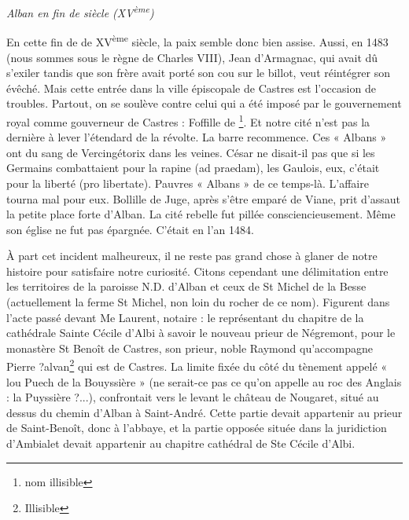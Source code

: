 \begin{center}
    {\Large\itshape Alban en fin de siècle (XV\textsuperscript{ème})}
\end{center}

\bigskip

En cette fin de de XV\textsuperscript{ème} siècle, la paix semble donc bien assise. Aussi, en 1483 (nous sommes sous le règne de Charles VIII), Jean d'Armagnac, qui avait dû s'exiler tandis que son frère avait porté son cou sur le billot, veut réintégrer son évêché. Mais cette entrée dans la ville épiscopale de Castres est l'occasion de troubles. Partout, on se soulève contre celui qui a été imposé par le gouvernement royal comme gouverneur de Castres : Foffille de \footnote{nom illisible}. Et notre cité n'est pas la dernière à lever l'étendard de la révolte. La barre recommence. Ces « Albans » ont du sang de Vercingétorix dans les veines. César ne disait-il pas que si les Germains combattaient pour la rapine (ad praedam), les Gaulois, eux, c'était pour la liberté (pro libertate). Pauvres « Albans » de ce temps-là. L'affaire tourna mal pour eux. Bollille de Juge, après s'être emparé de Viane, prit d'assaut la petite place forte d'Alban. La cité rebelle fut pillée consciencieusement. Même son église ne fut pas épargnée. C'était en l'an 1484.

À part cet incident malheureux, il ne reste pas grand chose à glaner de notre histoire pour satisfaire notre curiosité. Citons cependant une délimitation entre les territoires de la paroisse N.D. d'Alban et ceux de St Michel de la Besse (actuellement la ferme St Michel, non loin du rocher de ce nom). Figurent dans l'acte passé devant Me Laurent, notaire : le représentant du chapitre de la cathédrale Sainte Cécile d'Albi à savoir le nouveau prieur de Négremont, pour le monastère St Benoît de Castres, son prieur, noble Raymond qu'accompagne Pierre ?alvan\footnote{Illisible} qui est de Castres. La limite fixée du côté du tènement appelé « lou Puech de la Bouyssière » (ne serait-ce pas ce qu'on appelle au roc des Anglais : la Puyssière ?...), confrontait vers le levant le château de Nougaret, situé au dessus du chemin d'Alban à Saint-André. Cette partie devait appartenir au prieur de Saint-Benoît, donc à l'abbaye, et la partie opposée située dans la juridiction d'Ambialet devait appartenir au chapitre cathédral de Ste Cécile d'Albi.
